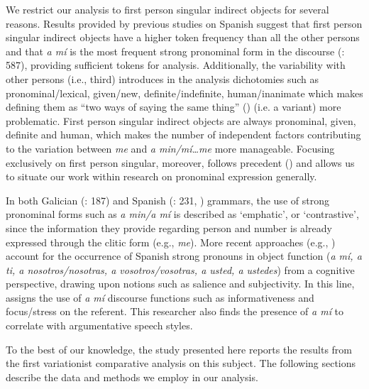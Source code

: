 \documentclass[output=paper]{langscibook}
\begin{document}
We restrict our analysis to first person singular indirect objects for several reasons. Results provided by previous studies on Spanish suggest that first person singular indirect objects have a higher token frequency than all the other persons \parencites[119]{DufterStark2008}[849]{VázquezRozas2012} and that \textit{a mí} is the most frequent strong pronominal form in the discourse (\citealt{AijónOliva2018}: 587), providing sufficient tokens for analysis. Additionally, the variability with other persons (i.e., third) introduces in the analysis dichotomies such as pronominal/lexical, given/new, definite/indefinite, human/inanimate which makes defining them as “two ways of saying the same thing” (\citealt{Labov1994, Tagliamonte2012}) (i.e. a variant) more problematic. First person singular indirect objects are always pronominal, given, definite and human, which makes the number of independent factors contributing to the variation between \textit{me} and \textit{a min/mí…me} more manageable. Focusing exclusively on first person singular, moreover, follows precedent (\citealt{Morales1980, Bentivoglio1987, Posio2013, Ramos2016, TorresCacoullosTravis2014, TorresCacoullosTravis2018, TorresCacoullosTravis2019, TravisTorresCacoullos2012, TravisCacoullos2021, TravisKidd2017}) and allows us to situate our work within research on pronominal expression generally. 

In both Galician (\citealt{FreixeiroMato2006}: 187) and Spanish (\citealt{GiliGaya1980}: 231, \citealt{Luján1999}) grammars, the use of strong pronominal forms such as \textit{a min\slash a mí} is described as ‘emphatic’, or ‘contrastive’, since the information they provide regarding person and number is already expressed through the clitic form (e.g., \textit{me}). More recent approaches (e.g., \citealt{Serrano2017,Serrano2018,AijónOliva2018}) account for the occurrence of Spanish strong pronouns in object function (\textit{a mí, a ti, a nosotros/nosotras, a vosotros/vosotras, a usted, a ustedes}) from a cognitive perspective, drawing upon notions such as salience and subjectivity. In this line, \citet{Serrano2018} assigns the use of \textit{a mí} discourse functions such as informativeness and focus/stress on the referent. This researcher also finds the presence of \textit{a mí} to correlate with argumentative speech styles. 

To the best of our knowledge, the study presented here reports the results from the first variationist comparative analysis on this subject. The following sections describe the data and methods we employ in our analysis. 
\end{document}

